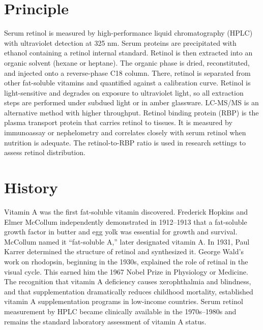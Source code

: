 \section*{Principle}
Serum retinol is measured by high-performance liquid chromatography (HPLC) with ultraviolet detection at 325 nm. Serum proteins are precipitated with ethanol containing a retinol internal standard. Retinol is then extracted into an organic solvent (hexane or heptane). The organic phase is dried, reconstituted, and injected onto a reverse-phase C18 column. There, retinol is separated from other fat-soluble vitamins and quantified against a calibration curve. Retinol is light-sensitive and degrades on exposure to ultraviolet light, so all extraction steps are performed under subdued light or in amber glassware. LC-MS/MS is an alternative method with higher throughput. Retinol binding protein (RBP) is the plasma transport protein that carries retinol to tissues. It is measured by immunoassay or nephelometry and correlates closely with serum retinol when nutrition is adequate. The retinol-to-RBP ratio is used in research settings to assess retinol distribution.

\section*{History}
Vitamin A was the first fat-soluble vitamin discovered. Frederick Hopkins and Elmer McCollum independently demonstrated in 1912--1913 that a fat-soluble growth factor in butter and egg yolk was essential for growth and survival. McCollum named it ``fat-soluble A,'' later designated vitamin A. In 1931, Paul Karrer determined the structure of retinol and synthesized it. George Wald's work on rhodopsin, beginning in the 1930s, explained the role of retinal in the visual cycle. This earned him the 1967 Nobel Prize in Physiology or Medicine. The recognition that vitamin A deficiency causes xerophthalmia and blindness, and that supplementation dramatically reduces childhood mortality, established vitamin A supplementation programs in low-income countries. Serum retinol measurement by HPLC became clinically available in the 1970s--1980s and remains the standard laboratory assessment of vitamin A status.

